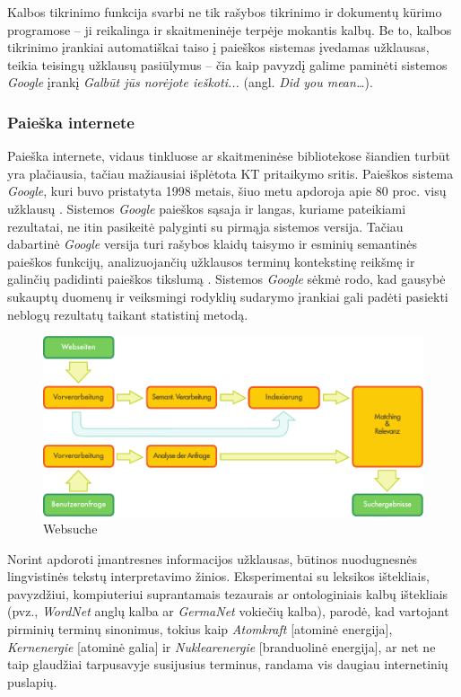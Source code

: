 \documentclass[]{../metanetpaper}
\begin{document}
\begin{multicols}{2}
    Kalbos tikrinimo funkcija svarbi ne tik rašybos tikrinimo ir dokumentų kūrimo programose – ji reikalinga ir skaitmeninėje terpėje mokantis kalbų. Be to, kalbos tikrinimo įrankiai automatiškai taiso į paieškos sistemas įvedamas užklausas, teikia teisingų užklausų pasiūlymus – čia kaip pavyzdį galime paminėti sistemos  \textit{Google} įrankį \textit{Galbūt jūs norėjote ieškoti...}  (angl. \textit{Did you mean…}).

\subsubsection{Paieška internete }

 Paieška internete, vidaus tinkluose ar skaitmeninėse bibliotekose šiandien turbūt yra plačiausia, tačiau mažiausiai išplėtota KT pritaikymo sritis. Paieškos sistema \textit{Google}, kuri buvo pristatyta 1998 metais, šiuo metu apdoroja apie 80 proc. visų užklausų \cite{spi1}.  Sistemos \textit{Google} paieškos sąsaja ir langas, kuriame pateikiami rezultatai, ne itin pasikeitė palyginti su pirmąja sistemos versija. Tačiau dabartinė \textit{Google} versija turi rašybos klaidų taisymo ir esminių semantinės paieškos funkcijų, analizuojančių užklausos terminų kontekstinę reikšmę ir galinčių padidinti paieškos tikslumą \cite{pc1}.  Sistemos \textit{Google} sėkmė rodo, kad gausybė sukauptų duomenų ir veiksmingi rodyklių sudarymo įrankiai gali padėti pasiekti neblogų rezultatų taikant statistinį metodą. 

\begin{figure}[htb]
  \center
  \includegraphics[width=\textwidth]{../_media/german/web_search_architecture}
  \caption{Websuche}
  \label{fig:websearcharch_de}
\end{figure}

 Norint apdoroti įmantresnes informacijos užklausas, būtinos nuodugnesnės lingvistinės tekstų interpretavimo žinios. Eksperimentai su leksikos ištekliais, pavyzdžiui, kompiuteriui suprantamais tezaurais ar ontologiniais kalbų ištekliais (pvz., \textit{WordNet} anglų kalba ar \textit{GermaNet} vokiečių kalba), parodė, kad vartojant pirminių terminų sinonimus, tokius kaip \textit{Atomkraft} [atominė energija], \textit{Kernenergie} [atominė galia] ir \textit{Nuklearenergie} [branduolinė energija], ar net ne taip glaudžiai tarpusavyje susijusius terminus, randama vis daugiau internetinių puslapių. 


\end{multicols}
\end{document}
